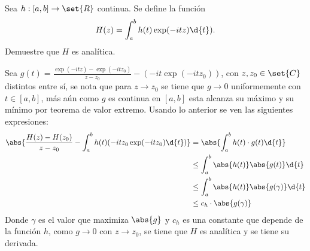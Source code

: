 \documentclass{homework}
\begin{document}
\begin{prob}
    Sea \(h:[a,b]\rightarrow\set{R}\) continua. Se define la función
    \[H(z)=\int_a^bh(t)\exp(-itz)\d{t}).\]
    Demuestre que \(H\) es analítica.
\end{prob}

\begin{sol}
    Sea \(g(t)=\frac{\exp(-itz)-\exp(-itz_0)}{z-z_0}-(-it\exp(-itz_0))\), con \(z,z_0\in\set{C}\) distintos entre sí, se nota que para \(z\rightarrow z_0\) se tiene que \(g\rightarrow 0\) uniformemente con \(t\in[a,b]\), más aún como \(g\) es continua en \([a,b]\) esta alcanza su máximo y su mínimo por teorema de valor extremo. Usando lo anterior se ven las siguientes expresiones:
    \begin{align*}
        \abs{\frac{H(z)-H(z_0)}{z-z_0}-\int_a^bh(t)(-itz_0\exp(-itz_0)\d{t})}&=\abs{\int_a^bh(t)\cdot g(t)\d{t}}\\
        &\leq\int_a^b\abs{h(t)}\abs{g(t)}\d{t}\\
        &\leq\int_a^b\abs{h(t)}\abs{g(\gamma)}\d{t}\\
        &\leq c_h\cdot\abs{g(\gamma)}
    \end{align*}
    Donde \(\gamma\) es el valor que maximiza \(\abs{g}\) y \(c_h\) es una constante que depende de la función \(h\), como \(g\rightarrow 0\) con \(z\rightarrow z_0\), se tiene que \(H\) es analítica y se tiene su derivada.
\end{sol}
\end{document}
